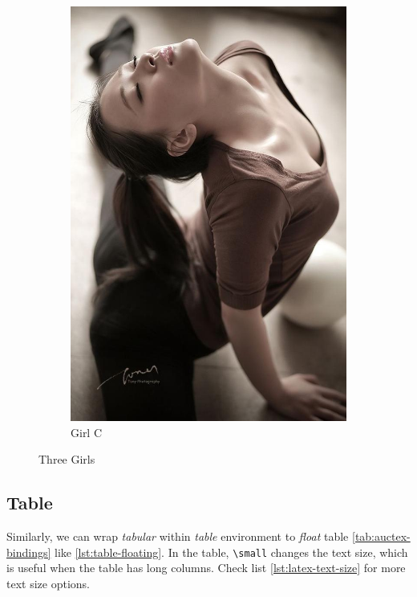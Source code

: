 \begin{figure}[tbp]
\begin{subfigure}[tbp]{0.3\linewidth}
    \includegraphics[width=\linewidth]{sub3}
    \caption{Girl C}
  \end{subfigure}
  \caption{Three Girls}
  \label{fig:three-girsl}
\end{figure}

\subsection{Table}
\label{sec:table}

Similarly, we can wrap \textit{tabular} within \textit{table}
environment to \textit{float} table \ref{tab:auctex-bindings} like
\ref{lst:table-floating}. In the table, \lstinline|\small| changes
the text size, which is useful when the table has long
columns. Check list \ref{lst:latex-text-size} for more text size
options.

